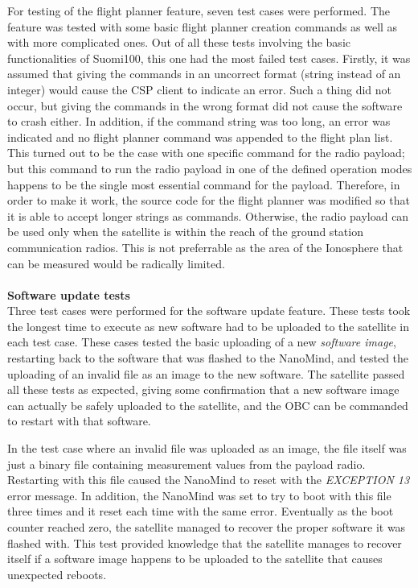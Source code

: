 \documentclass[english,12pt,a4paper,pdftex,elec,utf8]{aaltothesis}
\begin{document}
For testing of the flight planner feature, seven test cases were performed. The feature was tested with some basic flight planner creation commands as well as with more complicated ones. Out of all these tests involving the basic functionalities of Suomi100, this one had the most failed test cases. Firstly, it was assumed that giving the commands in an uncorrect format (string instead of an integer) would cause the CSP client to indicate an error. Such a thing did not occur, but giving the commands in the wrong format did not cause the software to crash either. In addition, if the command string was too long, an error was indicated and no flight planner command was appended to the flight plan list. This turned out to be the case with one specific command for the radio payload; but this command to run the radio payload in one of the defined operation modes happens to be the single most essential command for the payload. Therefore, in order to make it work, the source code for the flight planner was modified so that it is able to accept longer strings as commands. Otherwise, the radio payload can be used only when the satellite is within the reach of the ground station communication radios. This is not preferrable as the area of the Ionosphere that can be measured would be radically limited.\\
\\
\textbf{Software update tests}
\\ 
Three test cases were performed for the software update feature. These tests took the longest time to execute as new software had to be uploaded to the satellite in each test case. These cases tested the basic uploading of a new \textit{software image}, restarting back to the software that was flashed to the NanoMind, and tested the uploading of an invalid file as an image to the new software. The satellite passed all these tests as expected, giving some confirmation that a new software image can actually be safely uploaded to the satellite, and the OBC can be commanded to restart with that software. \par
In the test case where an invalid file was uploaded as an image, the file itself was just a binary file containing measurement values from the payload radio. Restarting with this file caused the NanoMind to reset with the \textit{EXCEPTION 13} error message. In addition, the NanoMind was set to try to boot with this file three times and it reset each time with the same error. Eventually as the boot counter reached zero, the satellite managed to recover the proper software it was flashed with. This test provided knowledge that the satellite manages to recover itself if a software image happens to be uploaded to the satellite that causes unexpected reboots.\par
\end{document}
